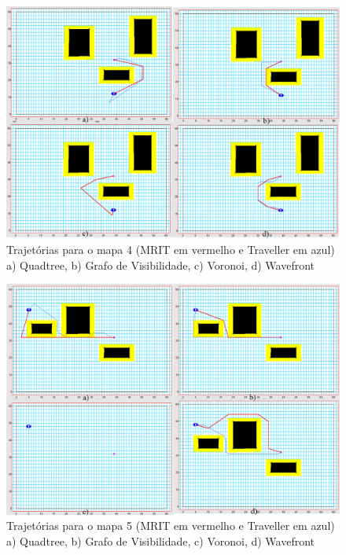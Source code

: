 \begin{figure}[H]
	\centering
	\label{fig42}
		\includegraphics[keepaspectratio=true,scale=0.3]{figuras/mapa4.jpg}
	\caption{Trajetórias para o mapa 4 (MRIT em vermelho e Traveller em azul) a) Quadtree, b) Grafo de Visibilidade, c) Voronoi, d) Wavefront}
\end{figure}

\begin{figure}[H]
	\centering
	\label{fig43}
		\includegraphics[keepaspectratio=true,scale=0.3]{figuras/mapa5.jpg}
	\caption{Trajetórias para o mapa 5 (MRIT em vermelho e Traveller em azul) a) Quadtree, b) Grafo de Visibilidade, c) Voronoi, d) Wavefront}
\end{figure}

